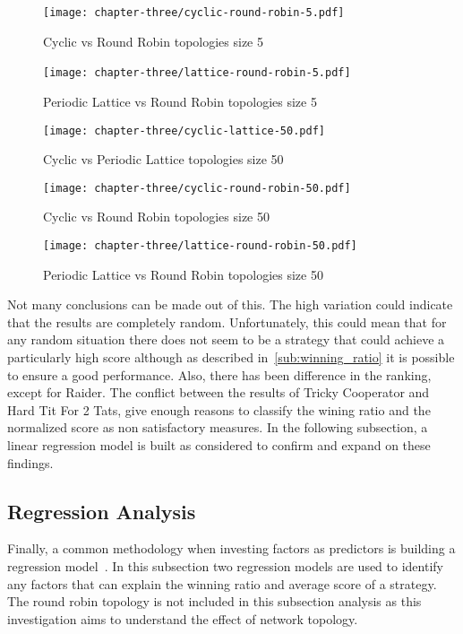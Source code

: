 \begin{figure}[H]
	\centering
	\texttt{[image: chapter-three/cyclic-round-robin-5.pdf]}\
	\caption{Cyclic vs Round Robin topologies size 5}
	\label{fig:score-rankings-five-c-r}
\end{figure}

\begin{figure}[H]
	\centering
	\texttt{[image: chapter-three/lattice-round-robin-5.pdf]}\
	\caption{Periodic Lattice vs Round
	Robin topologies size 5}
	\label{fig:score-rankings-five-l-r}
\end{figure}

\begin{figure}[H]
	\centering
	\texttt{[image: chapter-three/cyclic-lattice-50.pdf]}
	\caption{Cyclic vs Periodic Lattice topologies size 50}
	\label{fig:score-rankings-fifty-c-l}
\end{figure}

\begin{figure}[H]
	\centering
	\texttt{[image: chapter-three/cyclic-round-robin-50.pdf]}
	\caption{Cyclic vs Round Robin topologies size 50}
	\label{fig:score-rankings-fifty-c-r}
\end{figure}

\begin{figure}[H]
	\centering
	\texttt{[image: chapter-three/lattice-round-robin-50.pdf]}
	\caption{Periodic Lattice vs Round Robin topologies size 50}
	\label{fig:score-rankings-fifty-l-r}
\end{figure}

Not many conclusions can be made out of this. The high variation could indicate
that the results are completely random. Unfortunately, this could mean that for
any random situation there does not seem to be a strategy that could
achieve a particularly high score although as described in~\autoref{sub:winning_ratio}
it is possible to ensure a good performance. Also, there has been difference in
the ranking, except for Raider. The conflict between the results of Tricky Cooperator and Hard Tit For 2 Tats,
give enough reasons to classify the wining ratio and  the normalized score as non satisfactory
measures. In the following subsection, a linear regression model is built as
considered to confirm and expand on these findings.

\subsection{Regression Analysis}
\label{sub:regression}
Finally, a common methodology when investing factors as predictors is building a
regression model~\cite{Bingham2010}. In this subsection two regression models are
used to identify any factors that can explain the winning ratio and average score
of a strategy. The round robin topology is not included in this subsection analysis
as this investigation aims to understand the effect of network topology.

